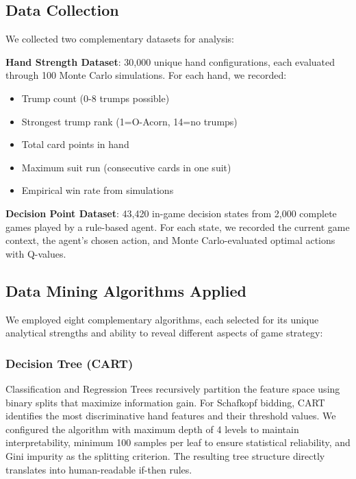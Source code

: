 \documentclass[conference]{IEEEtran}
\begin{document}
\subsection{Data Collection}

We collected two complementary datasets for analysis:

\textbf{Hand Strength Dataset}: 30,000 unique hand configurations, each evaluated through 100 Monte Carlo simulations. For each hand, we recorded:
\begin{itemize}
    \item Trump count (0-8 trumps possible)
    \item Strongest trump rank (1=O-Acorn, 14=no trumps)
    \item Total card points in hand
    \item Maximum suit run (consecutive cards in one suit)
    \item Empirical win rate from simulations
\end{itemize}

\textbf{Decision Point Dataset}: 43,420 in-game decision states from 2,000 complete games played by a rule-based agent. For each state, we recorded the current game context, the agent's chosen action, and Monte Carlo-evaluated optimal actions with Q-values.

\subsection{Data Mining Algorithms Applied}

We employed eight complementary algorithms, each selected for its unique analytical strengths and ability to reveal different aspects of game strategy:

\subsubsection{Decision Tree (CART)}
Classification and Regression Trees \cite{breiman1984classification} recursively partition the feature space using binary splits that maximize information gain. For Schafkopf bidding, CART identifies the most discriminative hand features and their threshold values. We configured the algorithm with maximum depth of 4 levels to maintain interpretability, minimum 100 samples per leaf to ensure statistical reliability, and Gini impurity as the splitting criterion. The resulting tree structure directly translates into human-readable if-then rules.
\end{document}
